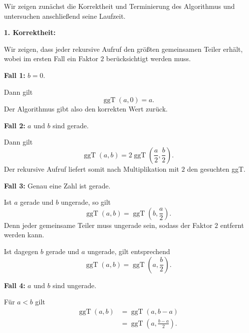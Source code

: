 \documentclass{report}
\begin{document}

\sol

\begin{myproof}
  Wir zeigen zunächst die Korrektheit und Terminierung
  des Algorithmus und untersuchen anschließend
  seine Laufzeit.

  \medskip
  \textbf{1. Korrektheit:}

  Wir zeigen, dass jeder rekursive Aufruf
  den größten gemeinsamen Teiler erhält,
  wobei im ersten Fall ein Faktor $2$
  berücksichtigt werden muss.

  \textbf{Fall 1:} $b=0$.

  Dann gilt
  \[
    \operatorname{ggT}(a,0)=a.
  \]
  Der Algorithmus gibt also den korrekten Wert zurück.

  \textbf{Fall 2:} $a$ und $b$ sind gerade.

  Dann gilt
  \[
    \operatorname{ggT}(a,b)
    =2\operatorname{ggT}\left(
      \frac a2,\frac b2
    \right).
  \]
  Der rekursive Aufruf liefert somit nach
  Multiplikation mit $2$ den gesuchten ggT.

  \textbf{Fall 3:} Genau eine Zahl ist gerade.

  Ist $a$ gerade und $b$ ungerade, so gilt
  \[
    \operatorname{ggT}(a,b)
    =\operatorname{ggT}\left(
      b,\frac a2
    \right).
  \]
  Denn jeder gemeinsame Teiler muss ungerade
  sein, sodass der Faktor $2$ entfernt
  werden kann.

  Ist dagegen $b$ gerade und $a$ ungerade,
  gilt entsprechend
  \[
    \operatorname{ggT}(a,b)
    =\operatorname{ggT}\left(
      a,\frac b2
    \right).
  \]

  \textbf{Fall 4:} $a$ und $b$ sind ungerade.

  Für $a<b$ gilt
  \begin{align*}
    \operatorname{ggT}(a,b)
    &=\operatorname{ggT}(a,b-a)\\
    &=\operatorname{ggT}\left(
      a,\frac{b-a}{2}
    \right).
  \end{align*}


\end{myproof}
\end{document}
